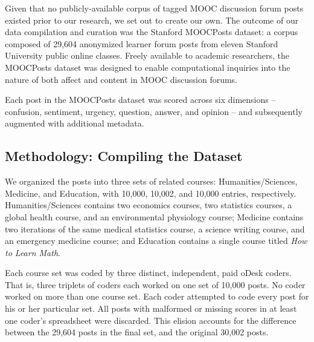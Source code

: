 \documentclass{edm_template}
\begin{document}
Given that no publicly-available corpus of tagged MOOC discussion forum posts existed prior to our research, we set out to create our own. The outcome of our data compilation and curation was the Stanford MOOCPosts dataset: a corpus composed of 29,604 anonymized learner forum posts from eleven Stanford University public online classes. Freely available to academic researchers, the MOOCPosts dataset was designed to enable computational inquiries into the nature of both affect and content in MOOC discussion forums.

Each post in the MOOCPosts dataset was scored across six dimensions -- confusion, sentiment, urgency, question, answer, and opinion -- and subsequently augmented with additional metadata.


\subsection{Methodology: Compiling the Dataset}
We organized the posts into three sets of related courses: Humanities/Sciences, Medicine, and Education, with 10,000, 10,002, and 10,000 entries, respectively. Humanities/Sciences contains two economics courses, two statistics courses, a global health course, and an environmental physiology course; Medicine contains two iterations of the same medical statistics course, a science writing course, and an emergency medicine course; and Education contains a single course titled \emph{How to Learn Math}. 

Each course set was coded by three distinct, independent, paid oDesk coders. That is, three triplets of coders each worked on one set of 10,000 posts. No coder worked on more than one course set. Each coder attempted to code every post for his or her particular set. All posts with malformed or missing scores in at least one coder's spreadsheet were discarded. This elision accounts for the difference between the 29,604 posts in the final set, and the original 30,002 posts.
\end{document}
